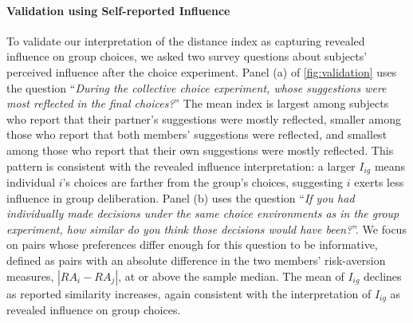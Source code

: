 \documentclass[11 pt]{article}
\begin{document}
\paragraph{Validation using Self-reported Influence}\label{subsection:validation} To validate our interpretation of the distance index as capturing revealed influence on group choices, we asked two survey questions about subjects' perceived influence after the choice experiment. Panel (a) of \autoref{fig:validation} uses the question ``\textit{During the collective choice experiment, whose suggestions were most reflected in the final choices?}'' The mean index is largest among subjects who report that their partner's suggestions were mostly reflected, smaller among those who report that both members' suggestions were reflected, and smallest among those who report that their own suggestions were mostly reflected. This pattern is consistent with the revealed influence interpretation: a larger $I_{ig}$ means individual $i$'s choices are farther from the group's choices, suggesting $i$ exerts less influence in group deliberation. Panel (b) uses the question ``\textit{If you had individually made decisions under the same choice environments as in the group experiment, how similar do you think those decisions would have been?}''. We focus on pairs whose preferences differ enough for this question to be informative, defined as pairs with an absolute difference in the two members' risk-aversion measures, $|RA_i-RA_j|$, at or above the sample median. The mean of $I_{ig}$ declines as reported similarity increases, again consistent with the interpretation of $I_{ig}$ as revealed influence on group choices.
\end{document}
